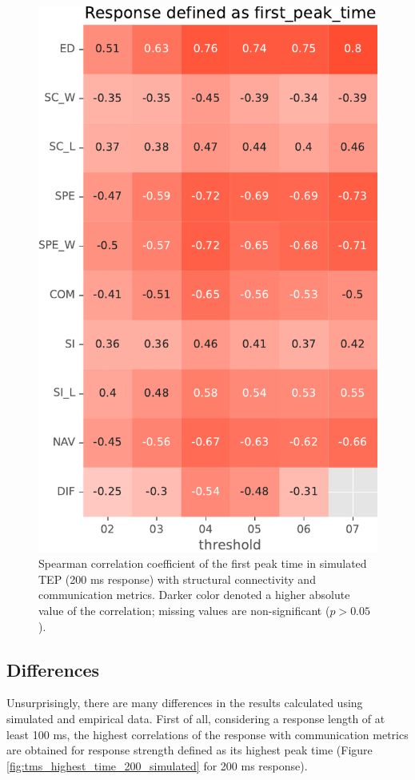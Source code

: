 \begin{figure}
    \centering
    \includegraphics[height=\textwidth]{images/nootebook_generated/pytepfit_results/simulated/200/not_over_threshold_nan/Response defined as first_peak_time.pdf}
    \caption[TEPs first peak time (200 ms) correlations (simulated data)]{Spearman correlation coefficient of the first peak time in simulated TEP (200 ms response) with structural connectivity and communication metrics. Darker color denoted a higher absolute value of the correlation; missing values are non-significant ($p>0.05$).}
    \label{fig:tms_first_time_200_simulated}
\end{figure}

\subsection{Differences}

Unsurprisingly, there are many differences in the results calculated using simulated and empirical data. First of all, considering a response length of at least 100 ms, the highest correlations of the response with communication metrics are obtained for response strength defined as its highest peak time (Figure \ref{fig:tms_highest_time_200_simulated} for 200 ms response).


